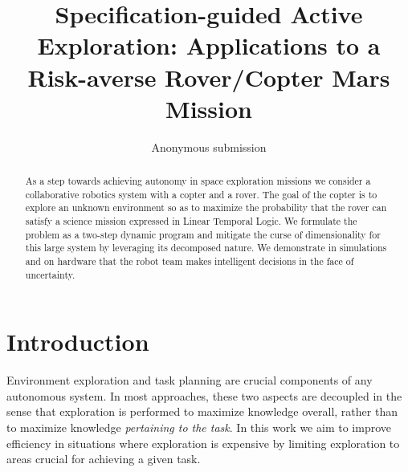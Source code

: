 \documentclass[draft,conference]{IEEEtran}
\begin{document}



\title{\huge Specification-guided Active Exploration: Applications to a Risk-averse Rover/Copter Mars Mission}



\author{Anonymous submission}

\maketitle

\begin{abstract}
  As a step towards achieving autonomy in space exploration missions we consider a collaborative robotics system with a copter and a rover. The goal of the copter is to explore an unknown environment so as to maximize the probability that the rover can satisfy a science mission expressed in Linear Temporal Logic. We formulate the problem as a two-step dynamic program and mitigate the curse of dimensionality for this large system by leveraging its decomposed nature. We demonstrate in simulations and on hardware that the robot team makes intelligent decisions in the face of uncertainty.
\end{abstract}

\IEEEpeerreviewmaketitle

	

\section{Introduction}

Environment exploration and task planning are crucial components of any autonomous system. In most approaches, these two aspects are decoupled in the sense that exploration is performed to maximize knowledge overall, rather than to maximize knowledge \emph{pertaining to the task}. In this work we aim to improve efficiency in situations where exploration is expensive by limiting exploration to areas crucial for achieving a given task. 
\end{document}
